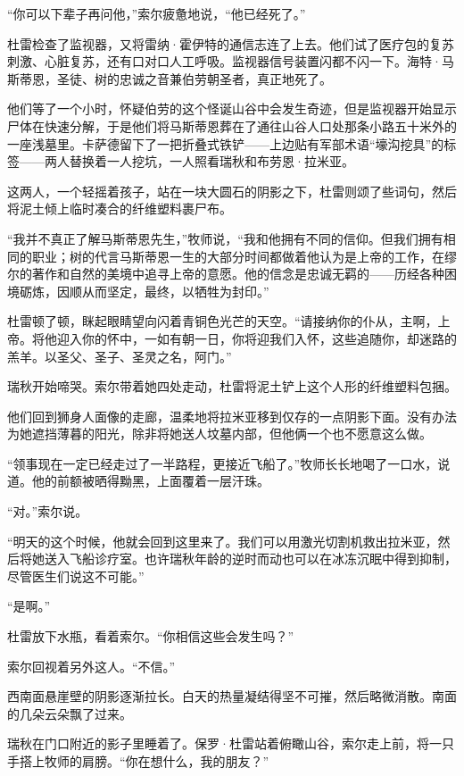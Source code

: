 \documentclass[AutoFakeBold=true]{book}
\begin{document}
``你可以下辈子再问他，''索尔疲惫地说，``他已经死了。''

杜雷检查了监视器，又将雷纳·霍伊特的通信志连了上去。他们试了医疗包的复苏刺激、心脏复苏，还有口对口人工呼吸。监视器信号装置闪都不闪一下。海特·马斯蒂恩，圣徒、树的忠诚之音兼伯劳朝圣者，真正地死了。

\vspace*{1em}

他们等了一个小时，怀疑伯劳的这个怪诞山谷中会发生奇迹，但是监视器开始显示尸体在快速分解，于是他们将马斯蒂恩葬在了通往山谷人口处那条小路五十米外的一座浅墓里。卡萨德留下了一把折叠式铁铲——上边贴有军部术语``壕沟挖具''的标签——两人替换着一人挖坑，一人照看瑞秋和布劳恩·拉米亚。

这两人，一个轻摇着孩子，站在一块大圆石的阴影之下，杜雷则颂了些词句，然后将泥土倾上临时凑合的纤维塑料裹尸布。

``我并不真正了解马斯蒂恩先生，''牧师说，``我和他拥有不同的信仰。但我们拥有相同的职业；树的代言马斯蒂恩一生的大部分时间都做着他认为是上帝的工作，在缪尔的著作和自然的美境中追寻上帝的意愿。他的信念是忠诚无羁的——历经各种困境砺炼，因顺从而坚定，最终，以牺牲为封印。''

杜雷顿了顿，眯起眼睛望向闪着青铜色光芒的天空。``请接纳你的仆从，主啊，上帝。将他迎入你的怀中，一如有朝一日，你将迎我们入怀，这些追随你，却迷路的羔羊。以圣父、圣子、圣灵之名，阿门。''

瑞秋开始啼哭。索尔带着她四处走动，杜雷将泥土铲上这个人形的纤维塑料包捆。

他们回到狮身人面像的走廊，温柔地将拉米亚移到仅存的一点阴影下面。没有办法为她遮挡薄暮的阳光，除非将她送人坟墓内部，但他俩一个也不愿意这么做。

``领事现在一定已经走过了一半路程，更接近飞船了。''牧师长长地喝了一口水，说道。他的前额被晒得黝黑，上面覆着一层汗珠。

``对。''索尔说。

``明天的这个时候，他就会回到这里来了。我们可以用激光切割机救出拉米亚，然后将她送入飞船诊疗室。也许瑞秋年龄的逆时而动也可以在冰冻沉眠中得到抑制，尽管医生们说这不可能。''

``是啊。''

杜雷放下水瓶，看着索尔。``你相信这些会发生吗？''

索尔回视着另外这人。``不信。''

\vspace*{1em}

西南面悬崖壁的阴影逐渐拉长。白天的热量凝结得坚不可摧，然后略微消散。南面的几朵云朵飘了过来。

瑞秋在门口附近的影子里睡着了。保罗·杜雷站着俯瞰山谷，索尔走上前，将一只手搭上牧师的肩膀。``你在想什么，我的朋友？''
\end{document}
